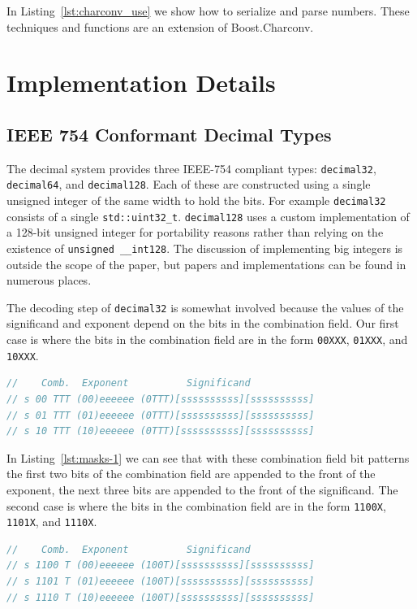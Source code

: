 \documentclass[acmsmall]{acmart}
\newcommand{\code}[1]{\texttt{#1}}
\begin{document}
In Listing~\ref{lst:charconv_use} we show how to serialize and parse numbers.
These techniques and functions are an extension of Boost.Charconv\cite{charconv}.

\section{Implementation Details}

\subsection{IEEE 754 Conformant Decimal Types}

The decimal system provides three IEEE-754 compliant types: \code{decimal32}, \code{decimal64}, and \code{decimal128}.
Each of these are constructed using a single unsigned integer of the same width to hold the bits.
For example \code{decimal32} consists of a single \code{std::uint32\_t}.
\code{decimal128} uses a custom implementation of a 128-bit unsigned integer for portability reasons rather than relying on the existence of \code{unsigned \_\_int128}.
The discussion of implementing big integers is outside the scope of the paper, but papers and implementations can be found in numerous places\cite{charconv}\cite{lemire2021number}\cite{knuth}.

The decoding step of \code{decimal32} is somewhat involved because the values of the significand and exponent depend on the bits in the combination field.
Our first case is where the bits in the combination field are in the form \code{00XXX}, \code{01XXX}, and \code{10XXX}.

\begin{lstlisting}[language=C++, caption={Combination Field Pattern 1}, label={lst:masks-1}]
//    Comb.  Exponent          Significand
// s 00 TTT (00)eeeeee (0TTT)[ssssssssss][ssssssssss]
// s 01 TTT (01)eeeeee (0TTT)[ssssssssss][ssssssssss]
// s 10 TTT (10)eeeeee (0TTT)[ssssssssss][ssssssssss]
\end{lstlisting}

In Listing~\ref{lst:masks-1} we can see that with these combination field bit patterns the first two bits of the combination field are appended to the front of the exponent,
the next three bits are appended to the front of the significand.
The second case is where the bits in the combination field are in the form \code{1100X}, \code{1101X}, and \code{1110X}.

\begin{lstlisting}[language=C++, caption={Combination Field Pattern 2}, label={lst:masks-2}]
//    Comb.  Exponent          Significand
// s 1100 T (00)eeeeee (100T)[ssssssssss][ssssssssss]
// s 1101 T (01)eeeeee (100T)[ssssssssss][ssssssssss]
// s 1110 T (10)eeeeee (100T)[ssssssssss][ssssssssss]
\end{lstlisting}
\end{document}
